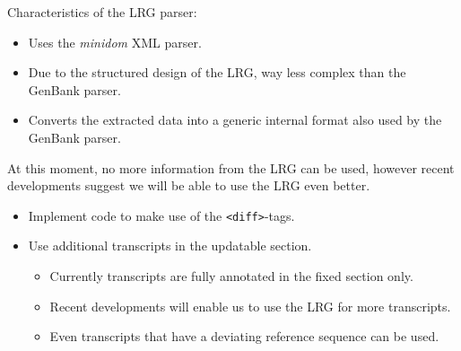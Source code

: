 \documentclass[a4, portrait]{seminar}
\begin{document}
\begin{slide}

Characteristics of the LRG parser:

\vspace{.5cm}
\begin{itemize}
  \item Uses the \emph{minidom} XML parser.
  \item Due to the structured design of the LRG, way less complex than the
    GenBank parser.
  \item Converts the extracted data into a generic internal format also used by 
    the GenBank parser.
\end{itemize}
\vfill
\end{slide}

\begin{slide}

At this moment, no more information from the LRG can be used, however recent
developments suggest we will be able to use the LRG even better.
\begin{itemize}
  \item Implement code to make use of the \texttt{<diff>}-tags.
  \item Use additional transcripts in the updatable section.
  \begin{itemize}
    \item Currently transcripts are fully annotated in the fixed section only.
    \item Recent developments will enable us to use the LRG for more
      transcripts.
    \item Even transcripts that have a deviating reference sequence can be 
      used.
  \end{itemize}
\end{itemize}
\vfill
\end{slide}
\end{document}

